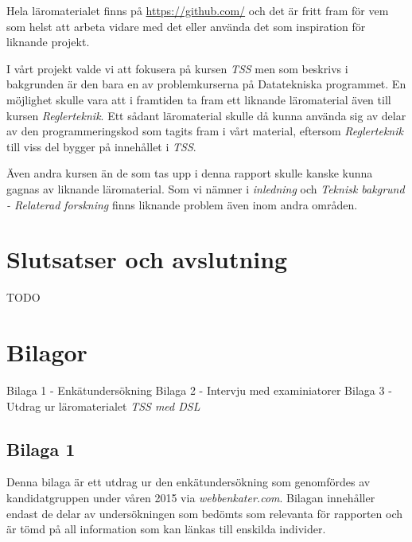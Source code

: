\documentclass[]{article}
\begin{document}
Hela läromaterialet finns på \url{https://github.com/} och det är
fritt fram för vem som helst att arbeta vidare med det eller använda
det som inspiration för liknande projekt.

I vårt projekt valde vi att fokusera på kursen \textit{TSS} men som
beskrivs i bakgrunden är den bara en av problemkurserna på
Datatekniska programmet. En möjlighet skulle vara att i framtiden ta
fram ett liknande läromaterial även till kursen
\textit{Reglerteknik}. Ett sådant läromaterial skulle då kunna använda
sig av delar av den programmeringskod som tagits fram i vårt material,
eftersom \textit{Reglerteknik} till viss del bygger på innehållet i
\textit{TSS}.

Även andra kursen än de som tas upp i denna rapport skulle kanske
kunna gagnas av liknande läromaterial. Som vi nämner i
\textit{inledning} och \textit{Teknisk bakgrund - Relaterad forskning}
finns liknande problem även inom andra områden.


\section{Slutsatser och avslutning}

TODO

\newpage





\newpage

\section{Bilagor}
Bilaga 1 - Enkätundersökning
Bilaga 2 - Intervju med examiniatorer
Bilaga 3 - Utdrag ur läromaterialet \textit{TSS med DSL}
\subsection{Bilaga 1}
Denna bilaga är ett utdrag ur den enkätundersökning som genomfördes av
kandidatgruppen under våren 2015 via \textit{webbenkater.com}. Bilagan
innehåller endast de delar av undersökningen som bedömts som relevanta
för rapporten och är tömd på all information som kan länkas till
enskilda individer. 
\end{document}
